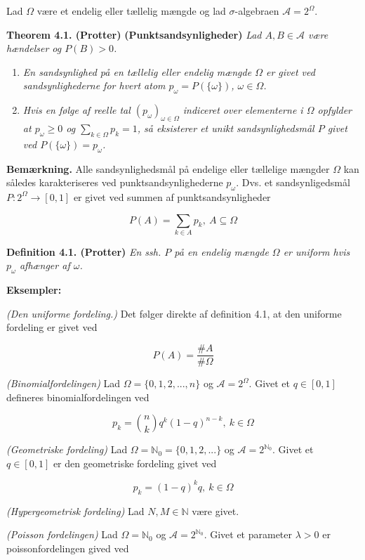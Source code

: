 \documentclass[a4paper,12pt,openany]{book}
\providecommand{\tightlist}{%
 \setlength{\itemsep}{0pt}\setlength{\parskip}{0pt}}
\begin{document}
Lad \(\Omega\) være et endelig eller tællelig mængde og lad \(\sigma\)-algebraen \(\mathcal{A}=2^\Omega\).

\textbf{Theorem 4.1. (Protter)} \textbf{(Punktsandsynligheder)} \emph{Lad \(A,B\in\mathcal{A}\) være hændelser og \(P(B)>0\).}

\begin{enumerate}
\def\labelenumi{\alph{enumi}.}
\tightlist
\item
  \emph{En sandsynlighed på en tællelig eller endelig mængde \(\Omega\) er givet ved sandsynlighederne for hvert atom \(p_\omega=P(\{\omega\})\), \(\omega\in\Omega\).}
\item
  \emph{Hvis en følge af reelle tal \((p_\omega)_{\omega\in\Omega}\) indiceret over elementerne i \(\Omega\) opfylder at \(p_\omega\ge0\) og \(\sum_{k\in\Omega}p_k=1\), så eksisterer et unikt sandsynlighedsmål \(P\) givet ved \(P(\{\omega\})=p_\omega\).}
\end{enumerate}

\textbf{Bemærkning.} Alle sandsynlighedsmål på endelige eller tællelige mængder \(\Omega\) kan således karakteriseres ved punktsandsynlighederne \(p_\omega\). Dvs. et sandsynligedsmål \(P : 2^\Omega \to [0,1]\) er givet ved summen af punktsandsynligheder

\[
P(A)=\sum_{k\in A}p_k,\ A\subseteq\Omega
\]

\textbf{Definition 4.1. (Protter)} \emph{En ssh. \(P\) på en endelig mængde \(\Omega\) er uniform hvis \(p_\omega\) afhænger af \(\omega\).}

\textbf{Eksempler:}

\emph{(Den uniforme fordeling.)} Det følger direkte af definition 4.1, at den uniforme fordeling er givet ved

\[
P(A)=\frac{\#A}{\#\Omega}
\]

\emph{(Binomialfordelingen)} Lad \(\Omega=\{0,1,2,...,n\}\) og \(\mathcal{A}=2^\Omega\). Givet et \(q\in[0,1]\) defineres binomialfordelingen ved

\[
p_k={n\choose k}q^k(1-q)^{n-k},\ k\in\Omega
\]

\emph{(Geometriske fordeling)} Lad \(\Omega=\mathbb{N}_0=\{0,1,2,...\}\) og \(\mathcal{A}=2^{\mathbb{N}_0}\). Givet et \(q\in[0,1]\) er den geometriske fordeling givet ved

\[
p_k=(1-q)^kq,\ k\in\Omega
\]

\emph{(Hypergeometrisk fordeling)} Lad \(N,M\in\mathbb{N}\) være givet.

\emph{(Poisson fordelingen)} Lad \(\Omega=\mathbb{N}_0\) og \(\mathcal{A}=2^{\mathbb{N}_0}\). Givet et parameter \(\lambda>0\) er poissonfordelingen gived ved
\end{document}
